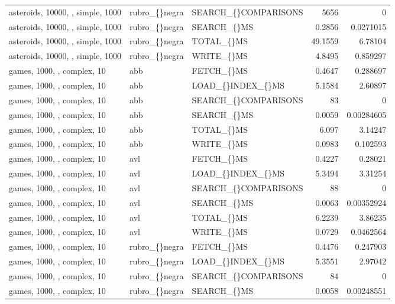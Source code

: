 \begin{longtable}{p{4cm}p{1.4cm}p{2.6cm}rr}
asteroids, 10000, , simple, 1000 & rubro\_\allowbreak\{\}negra & SEARCH\_\allowbreak\{\}COMPARISONS & 5656 & 0\\
asteroids, 10000, , simple, 1000 & rubro\_\allowbreak\{\}negra & SEARCH\_\allowbreak\{\}MS & 0.2856 & 0.0271015\\
asteroids, 10000, , simple, 1000 & rubro\_\allowbreak\{\}negra & TOTAL\_\allowbreak\{\}MS & 49.1559 & 6.78104\\
asteroids, 10000, , simple, 1000 & rubro\_\allowbreak\{\}negra & WRITE\_\allowbreak\{\}MS & 4.8495 & 0.859297\\
games, 1000, , complex, 10 & abb & FETCH\_\allowbreak\{\}MS & 0.4647 & 0.288697\\
games, 1000, , complex, 10 & abb & LOAD\_\allowbreak\{\}INDEX\_\allowbreak\{\}MS & 5.1584 & 2.60897\\
games, 1000, , complex, 10 & abb & SEARCH\_\allowbreak\{\}COMPARISONS & 83 & 0\\
games, 1000, , complex, 10 & abb & SEARCH\_\allowbreak\{\}MS & 0.0059 & 0.00284605\\
games, 1000, , complex, 10 & abb & TOTAL\_\allowbreak\{\}MS & 6.097 & 3.14247\\
games, 1000, , complex, 10 & abb & WRITE\_\allowbreak\{\}MS & 0.0983 & 0.102593\\
games, 1000, , complex, 10 & avl & FETCH\_\allowbreak\{\}MS & 0.4227 & 0.28021\\
games, 1000, , complex, 10 & avl & LOAD\_\allowbreak\{\}INDEX\_\allowbreak\{\}MS & 5.3494 & 3.31254\\
games, 1000, , complex, 10 & avl & SEARCH\_\allowbreak\{\}COMPARISONS & 88 & 0\\
games, 1000, , complex, 10 & avl & SEARCH\_\allowbreak\{\}MS & 0.0063 & 0.00352924\\
games, 1000, , complex, 10 & avl & TOTAL\_\allowbreak\{\}MS & 6.2239 & 3.86235\\
games, 1000, , complex, 10 & avl & WRITE\_\allowbreak\{\}MS & 0.0729 & 0.0462564\\
games, 1000, , complex, 10 & rubro\_\allowbreak\{\}negra & FETCH\_\allowbreak\{\}MS & 0.4476 & 0.247903\\
games, 1000, , complex, 10 & rubro\_\allowbreak\{\}negra & LOAD\_\allowbreak\{\}INDEX\_\allowbreak\{\}MS & 5.3551 & 2.97042\\
games, 1000, , complex, 10 & rubro\_\allowbreak\{\}negra & SEARCH\_\allowbreak\{\}COMPARISONS & 84 & 0\\
games, 1000, , complex, 10 & rubro\_\allowbreak\{\}negra & SEARCH\_\allowbreak\{\}MS & 0.0058 & 0.00248551\\

\end{longtable}
